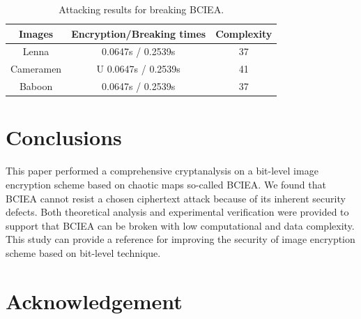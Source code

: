 \documentclass[final,3p,times,twocolumn]{elsarticle}
\begin{document}
%

\begin{table}[!htb]
	\label{tab:exp_result}
	\caption{Attacking results for breaking BCIEA.}
	\centering
	\begin{tabular}{ccc}
		\hline
		\textbf{Images}  & \textbf{Encryption/Breaking times} & \textbf{Complexity} \\
		\hline 
		Lenna & 0.0647s / 0.2539s  & 37  \\ 
		Cameramen & U 0.0647s / 0.2539s  & 41  \\  
		Baboon& 0.0647s / 0.2539s  & 37  \\ 
		\hline
	\end{tabular}
	\label{tab:exp_results}
\end{table}



\section{Conclusions}


This paper performed a comprehensive cryptanalysis on a bit-level image encryption scheme based on chaotic maps so-called BCIEA. We found that BCIEA cannot resist a chosen ciphertext attack because of its inherent security defects. Both theoretical analysis and experimental verification were provided to support that BCIEA can be broken with low computational and data complexity. This study can provide a reference for improving the security of image encryption scheme based on bit-level technique.


\cite{Shafique2018epjp,MPEanalysis2015infsci,Diaconu2015infsci,Stinson2006,fengw2018ieeepj,wenh2019epjp,zhuzl2011infsci,Lcq:Optimal:SP11,Jolfaei2016TransIFS,Uhl2018Trans,YE2010PRL,fridrich1998symmetric,lic2016sigpro,ozkaynak:review:ND18,shannon1949communication,tengl2017MTA}
\cite{WangC2017OLE}

\section*{Acknowledgement}




\end{document}
